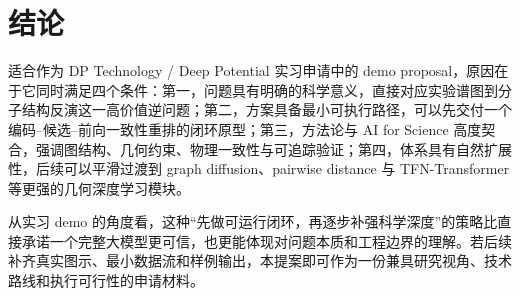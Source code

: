 \section{结论}
\projectname{} 适合作为 DP Technology / Deep Potential 实习申请中的 demo proposal，原因在于它同时满足四个条件：第一，问题具有明确的科学意义，直接对应实验谱图到分子结构反演这一高价值逆问题；第二，方案具备最小可执行路径，可以先交付一个编码--候选--前向一致性重排的闭环原型；第三，方法论与 AI for Science 高度契合，强调图结构、几何约束、物理一致性与可追踪验证；第四，体系具有自然扩展性，后续可以平滑过渡到 graph diffusion、pairwise distance 与 TFN-Transformer 等更强的几何深度学习模块。

从实习 demo 的角度看，这种“先做可运行闭环，再逐步补强科学深度”的策略比直接承诺一个完整大模型更可信，也更能体现对问题本质和工程边界的理解。若后续补齐真实图示、最小数据流和样例输出，本提案即可作为一份兼具研究视角、技术路线和执行可行性的申请材料。
